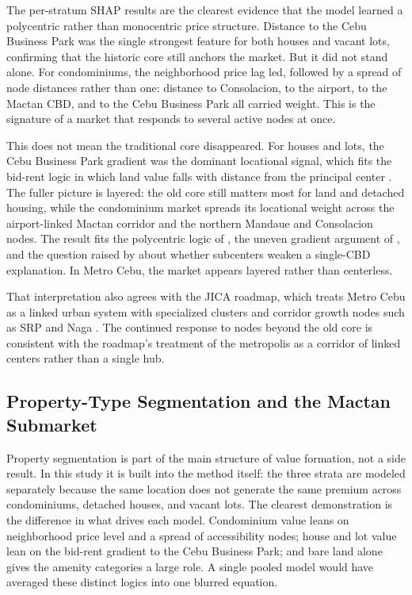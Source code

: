 The per-stratum SHAP results are the clearest evidence that the model learned a polycentric rather than monocentric price structure. Distance to the Cebu Business Park was the single strongest feature for both houses and vacant lots, confirming that the historic core still anchors the market. But it did not stand alone. For condominiums, the neighborhood price lag led, followed by a spread of node distances rather than one: distance to Consolacion, to the airport, to the Mactan CBD, and to the Cebu Business Park all carried weight. This is the signature of a market that responds to several active nodes at once.

This does not mean the traditional core disappeared. For houses and lots, the Cebu Business Park gradient was the dominant locational signal, which fits the bid-rent logic in which land value falls with distance from the principal center \parencite{alonso1964location,muth1969cities}. The fuller picture is layered: the old core still matters most for land and detached housing, while the condominium market spreads its locational weight across the airport-linked Mactan corridor and the northern Mandaue and Consolacion nodes. The result fits the polycentric logic of \textcite{giuliano1991subcenters}, the uneven gradient argument of \textcite{mcmillen2003employment}, and the question raised by \textcite{heikkila1989cbd} about whether subcenters weaken a single-CBD explanation. In Metro Cebu, the market appears layered rather than centerless.

That interpretation also agrees with the JICA roadmap, which treats Metro Cebu as a linked urban system with specialized clusters and corridor growth nodes such as SRP and Naga \parencite{jica2015metrocebu}. The continued response to nodes beyond the old core is consistent with the roadmap's treatment of the metropolis as a corridor of linked centers rather than a single hub.

\subsection{Property-Type Segmentation and the Mactan Submarket}\label{property-type-and-the-mactan-island-premium}

Property segmentation is part of the main structure of value formation, not a side result. In this study it is built into the method itself: the three strata are modeled separately because the same location does not generate the same premium across condominiums, detached houses, and vacant lots. The clearest demonstration is the difference in what drives each model. Condominium value leans on neighborhood price level and a spread of accessibility nodes; house and lot value lean on the bid-rent gradient to the Cebu Business Park; and bare land alone gives the amenity categories a large role. A single pooled model would have averaged these distinct logics into one blurred equation.

